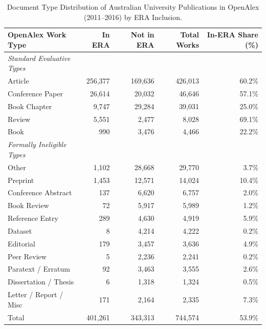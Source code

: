 \begin{table}[htbp]
\centering
\caption{Document Type Distribution of Australian University Publications in OpenAlex (2011--2016) by ERA Inclusion.}
\label{tab:document_types}
\begin{tabular*}{\textwidth}{@{\extracolsep{\fill}}lrrrr@{}}
\toprule
OpenAlex Work Type & In ERA & Not in ERA & Total Works & In-ERA Share (\%) \\
\midrule
\textit{Standard Evaluative Types} & & & & \\
Article                 & 256,377 & 169,636 & 426,013 & 60.2\% \\
Conference Paper        &  26,614 &  20,032 &  46,646 & 57.1\% \\
Book Chapter            &   9,747 &  29,284 &  39,031 & 25.0\% \\
Review                  &   5,551 &   2,477 &   8,028 & 69.1\% \\
Book                    &     990 &   3,476 &   4,466 & 22.2\% \\
\midrule
\textit{Formally Ineligible Types} & & & & \\
Other                   &   1,102 &  28,668 &  29,770 &  3.7\% \\
Preprint                &   1,453 &  12,571 &  14,024 & 10.4\% \\
Conference Abstract     &     137 &   6,620 &   6,757 &  2.0\% \\
Book Review             &      72 &   5,917 &   5,989 &  1.2\% \\
Reference Entry         &     289 &   4,630 &   4,919 &  5.9\% \\
Dataset                 &       8 &   4,214 &   4,222 &  0.2\% \\
Editorial               &     179 &   3,457 &   3,636 &  4.9\% \\
Peer Review             &       5 &   2,236 &   2,241 &  0.2\% \\
Paratext / Erratum      &      92 &   3,463 &   3,555 &  2.6\% \\
Dissertation / Thesis   &       6 &   1,318 &   1,324 &  0.5\% \\
Letter / Report / Misc  &     171 &   2,164 &   2,335 &  7.3\% \\
\midrule
Total                   & 401,261 & 343,313 & 744,574 & 53.9\% \\
\bottomrule
\end{tabular*}
\end{table}

